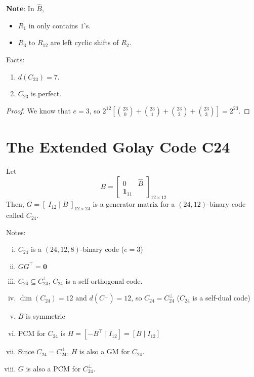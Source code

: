 \textbf{Note}: In $ \hat{B} $,
\begin{itemize}
    \item $ R_1 $ in only contains $ 1 $'s.
    \item $ R_3 $ to $ R_{12} $ are left cyclic shifts of $ R_2 $.
\end{itemize}

\begin{thmbox}
    \begin{theorem}
        Facts:
        \begin{enumerate}
            \item $ d(C_{23})=7 $.
            \item $ C_{23} $ is perfect.
        \end{enumerate}
    \end{theorem}
\end{thmbox}

\begin{proof}
    We know that $ e=3 $, so
    $ 2^{12}\left[ \binom{23}{0}+\binom{23}{1}+\binom{23}{2}+\binom{23}{3} \right]=
        2^{23} $.
\end{proof}

\section{The Extended Golay Code C24}
Let
\[ B=
    \left[
        \begin{array}{c|c}
            0 & \hat{B} \\
            \bm{1}_{11}
        \end{array}
        \right]_{12\times 12}
\]
Then, $ G=\left[\; I_{12}\mid B \;\right]_{12\times 24} $ is a generator
matrix for a $ (24,12) $-binary code called $ C_{24} $.

Notes:
\begin{enumerate}[(i)]
    \item $ C_{24} $ is a $ (24,12,8) $-binary code ($ e=3 $)
    \item $ GG^\top=\bm{0} $
    \item $ C_{24}\subseteq C_{24}^\perp $, $ C_{24} $ is a self-orthogonal code.
    \item $ \dim (C_{24})=12 $ and $ d(C^{\perp})=12 $, so
          $ C_{24}=C_{24}^\perp $ ($ C_{24} $ is a self-dual code)
    \item $ B $ is symmetric
    \item PCM for $ C_{24} $ is $ H=\left[ -B ^\top \mid I_{12} \right]=
              \left[ B\mid I_{12} \right] $
    \item Since $ C_{24}=C_{24}^\perp $, $ H $ is also a GM for $ C_{24} $.
    \item $ G $ is also a PCM for $ C_{24}^\perp $.
\end{enumerate}

